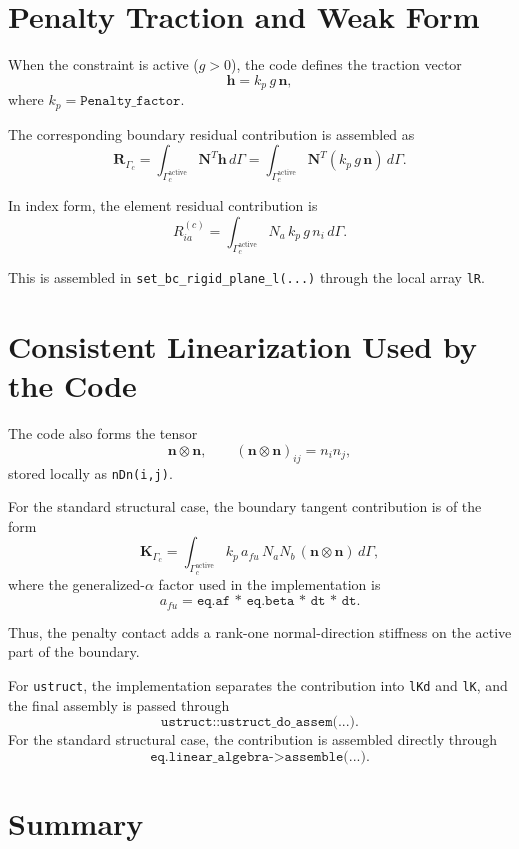 \documentclass[11pt]{article}
\begin{document}
\section{Penalty Traction and Weak Form}

When the constraint is active (\(g>0\)), the code defines the traction vector
\[
\mathbf{h} = k_p\, g\, \mathbf{n},
\]
where \(k_p = \texttt{Penalty\_factor}\).

The corresponding boundary residual contribution is assembled as
\[
\mathbf{R}_{\Gamma_c}
= \int_{\Gamma_c^{\text{active}}} \mathbf{N}^T \mathbf{h}\, d\Gamma
= \int_{\Gamma_c^{\text{active}}} \mathbf{N}^T
\left(k_p\, g\, \mathbf{n}\right)\, d\Gamma.
\]

In index form, the element residual contribution is
\[
R_{ia}^{(c)}
= \int_{\Gamma_c^{\text{active}}}
N_a\, k_p\, g\, n_i\, d\Gamma.
\]

This is assembled in \texttt{set\_bc\_rigid\_plane\_l(...)} through the local
array \texttt{lR}.

\section{Consistent Linearization Used by the Code}

The code also forms the tensor
\[
\mathbf{n}\otimes\mathbf{n},
\qquad
(\mathbf{n}\otimes\mathbf{n})_{ij} = n_i n_j,
\]
stored locally as \texttt{nDn(i,j)}.

For the standard structural case, the boundary tangent contribution is of the
form
\[
\mathbf{K}_{\Gamma_c}
= \int_{\Gamma_c^{\text{active}}}
k_p\, a_{fu}\, N_a N_b \, (\mathbf{n}\otimes\mathbf{n})\, d\Gamma,
\]
where the generalized-\(\alpha\) factor used in the implementation is
\[
a_{fu} = \texttt{eq.af * eq.beta * dt * dt}.
\]

Thus, the penalty contact adds a rank-one normal-direction stiffness on the
active part of the boundary.

For \texttt{ustruct}, the implementation separates the contribution into
\texttt{lKd} and \texttt{lK}, and the final assembly is passed through
\[
\texttt{ustruct::ustruct\_do\_assem(...)}.
\]
For the standard structural case, the contribution is assembled directly through
\[
\texttt{eq.linear\_algebra->assemble(...)}.
\]

\section{Summary}
\end{document}
